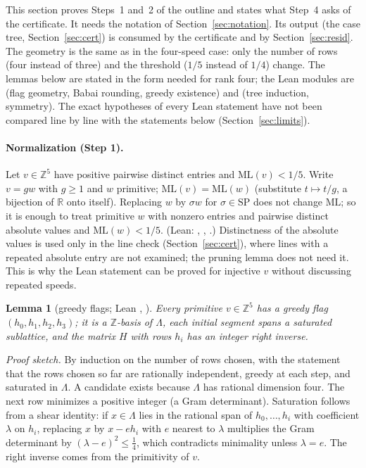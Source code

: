\documentclass[11pt]{article}
\newtheorem{lemma}[theorem]{Lemma}
\theoremstyle{remark}
\newcommand{\ML}{\mathrm{ML}}
\newcommand{\R}{\mathbb{R}}
\newcommand{\Z}{\mathbb{Z}}
\begin{document}
This section proves Steps~1 and~2 of the outline and states what Step~4 asks of the certificate. It needs the notation of Section~\ref{sec:notation}. Its output (the case tree, Section~\ref{sec:cert}) is consumed by the certificate and by Section~\ref{sec:resid}. The geometry is the same as in the four-speed case: only the number of rows (four instead of three) and the threshold ($1/5$ instead of $1/4$) change. The lemmas below are stated in the form needed for rank four; the Lean modules are  (flag geometry, Babai rounding, greedy existence) and  (tree induction, symmetry). The exact hypotheses of every Lean statement have not been compared line by line with the statements below (Section~\ref{sec:limits}).

\paragraph{Normalization (Step 1).} Let $v\in\Z^5$ have positive pairwise distinct entries and $\ML(v)<1/5$. Write $v=gw$ with $g\ge1$ and $w$ primitive; $\ML(v)=\ML(w)$ (substitute $t\mapsto t/g$, a bijection of $\R$ onto itself). Replacing $w$ by $\sigma w$ for $\sigma\in\mathrm{SP}$ does not change $\ML$; so it is enough to treat primitive $w$ with nonzero entries and pairwise distinct absolute values and $\ML(w)<1/5$. (Lean: , , .) Distinctness of the absolute values is used only in the line check (Section~\ref{sec:cert}), where lines with a repeated absolute entry are not examined; the pruning lemma does not need it. This is why the Lean statement can be proved for injective $v$ without discussing repeated speeds.

\begin{lemma}[greedy flags; Lean , ]\label{lem:flag}
Every primitive $v\in\Z^5$ has a greedy flag $(h_0,h_1,h_2,h_3)$; it is a $\Z$-basis of $\Lambda$, each initial segment spans a saturated sublattice, and the matrix $H$ with rows $h_i$ has an integer right inverse.
\end{lemma}
\emph{Proof sketch.} By induction on the number of rows chosen, with the statement that the rows chosen so far are rationally independent, greedy at each step, and saturated in $\Lambda$. A candidate exists because $\Lambda$ has rational dimension four. The next row minimizes a positive integer (a Gram determinant). Saturation follows from a shear identity: if $x\in\Lambda$ lies in the rational span of $h_0,\dots,h_i$ with coefficient $\lambda$ on $h_i$, replacing $x$ by $x-eh_i$ with $e$ nearest to $\lambda$ multiplies the Gram determinant by $(\lambda-e)^2\le\frac14$, which contradicts minimality unless $\lambda=e$. The right inverse comes from the primitivity of $v$.
\end{document}
